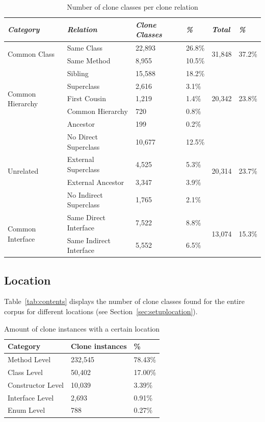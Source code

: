 \begin{table}[H]
\centering
\begin{tabular}{@{}llllll@{}}
\toprule
\textit{\textbf{Category}} & \textit{\textbf{Relation}} & \textit{\textbf{Clone Classes}} & \textit{\textbf{\%}} & \textit{\textbf{Total}} & \textit{\textbf{\%}} \\ \midrule
\multirow{2}{*}{Common Class} & Same Class & 22,893 & 26.8\% & \multirow{2}{*}{31,848} & \multirow{2}{*}{37.2\%} \\ \cmidrule(lr){2-4}
 & Same Method & 8,955 & 10.5\% & & \\ \midrule
\multirow{5}{*}{Common Hierarchy} & Sibling & 15,588 & 18.2\% & \multirow{5}{*}{20,342}& \multirow{5}{*}{23.8\%} \\ \cmidrule(lr){2-4}
 & Superclass & 2,616 & 3.1\% & & \\ \cmidrule(lr){2-4}
 & First Cousin & 1,219 & 1.4\% & & \\ \cmidrule(lr){2-4}
 & Common Hierarchy & 720 & 0.8\% & & \\ \cmidrule(lr){2-4}
 & Ancestor & 199 & 0.2\% & & \\ \midrule
\multirow{4}{*}{Unrelated} & No Direct Superclass & 10,677 & 12.5\% & \multirow{4}{*}{20,314}& \multirow{4}{*}{23.7\%} \\ \cmidrule(lr){2-4}
 & External Superclass & 4,525 & 5.3\% & & \\ \cmidrule(lr){2-4}
 & External Ancestor & 3,347 & 3.9\% & & \\ \cmidrule(lr){2-4}
 & No Indirect Superclass & 1,765 & 2.1\% & & \\ \midrule
\multirow{2}{*}{Common Interface} & Same Direct Interface & 7,522 & 8.8\% & \multirow{2}{*}{13,074} & \multirow{2}{*}{15.3\%} \\ \cmidrule(lr){2-4}
 & Same Indirect Interface & 5,552 & 6.5\% & & \\ \bottomrule
\end{tabular}
\caption{Number of clone classes per clone relation}
\label{tab:relation}
\end{table}

\subsection{Location}
Table~\ref{tab:contents} displays the number of clone classes found for the entire corpus for different locations (see Section~\ref{sec:setuplocation}).
\begin{table}[H]
\centering
\begin{tabular}{@{}lll@{}}
\toprule
Category & Clone instances & \% \\ \midrule
Method Level & 232,545 & 78.43\% \\
Class Level & 50,402 & 17.00\% \\
Constructor Level & 10,039 & 3.39\% \\
Interface Level & 2,693 & 0.91\% \\
Enum Level & 788 & 0.27\% \\
\end{tabular}
\caption{Amount of clone instances with a certain location}
\label{tab:location}
\end{table}

